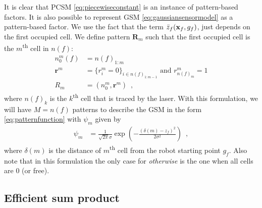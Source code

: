 \documentclass[letterpaper, 10 pt, conference]{ieeeconf} %
\newcommand{\vect}[1]{\mathbf{#1}}
\begin{document}
It is clear that PCSM \eqref{eq:piecewiseconstant} is an instance of 
pattern-based factors. It is also possible to represent GSM
\eqref{eq:gaussiansensormodel} as a pattern-based factor. We use the fact that
the term $\bar{z}_f(\map_f, g_f)$, just depends on the first occupied cell. We
define pattern $\vect{R}_m$ such that the first occupied cell is
the $m$\textsuperscript{th} cell in $n(f)$:
\begin{align}
  n^m_0(f) &= n(f)_{1:m}\\
\vect{r}^m &= \{ r^m_{i} = 0 \}_{i \in n(f)_{1:m-1}} \text{ and } r^m_{n(f)_m} = 1\\
       R_m &= (n^m_0, \vect{r}^m)
  \enspace,
\end{align}
where $n(f)_{k}$ is the $k$\textsuperscript{th} cell that is traced by the laser. With
this formulation, we will have $M = n(f)$ patterns to describe the GSM
in the form \eqref{eq:patternfunction} with $\psi_m$ given by
\begin{align}
  \psi_m &= \frac{1}{\sqrt{2\pi}\sigma}\exp\left(-\frac{(\delta(m)- z_f)^2}{2\sigma^2}\right)
  \enspace,
\end{align}
where $\delta(m)$ is the distance of $m$\textsuperscript{th} cell from the robot
starting point $g_f$. Also note that in this formulation the only case for
\emph{otherwise} is the one when all cells are $0$ (or free).


\subsection{Efficient sum product}
\end{document}
